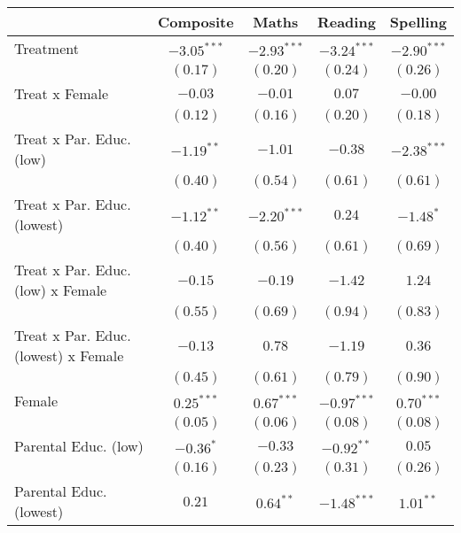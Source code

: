 
\begin{table}
\begin{center}
\begin{tabular}{l c c c c}
\hline
 & Composite & Maths & Reading & Spelling \\
\hline
Treatment                            & $-3.05^{***}$ & $-2.93^{***}$ & $-3.24^{***}$ & $-2.90^{***}$ \\
                                     & $(0.17)$      & $(0.20)$      & $(0.24)$      & $(0.26)$      \\
Treat x Female                       & $-0.03$       & $-0.01$       & $0.07$        & $-0.00$       \\
                                     & $(0.12)$      & $(0.16)$      & $(0.20)$      & $(0.18)$      \\
Treat x Par. Educ. (low)             & $-1.19^{**}$  & $-1.01$       & $-0.38$       & $-2.38^{***}$ \\
                                     & $(0.40)$      & $(0.54)$      & $(0.61)$      & $(0.61)$      \\
Treat x Par. Educ. (lowest)          & $-1.12^{**}$  & $-2.20^{***}$ & $0.24$        & $-1.48^{*}$   \\
                                     & $(0.40)$      & $(0.56)$      & $(0.61)$      & $(0.69)$      \\
Treat x Par. Educ. (low) x Female    & $-0.15$       & $-0.19$       & $-1.42$       & $1.24$        \\
                                     & $(0.55)$      & $(0.69)$      & $(0.94)$      & $(0.83)$      \\
Treat x Par. Educ. (lowest) x Female & $-0.13$       & $0.78$        & $-1.19$       & $0.36$        \\
                                     & $(0.45)$      & $(0.61)$      & $(0.79)$      & $(0.90)$      \\
Female                               & $0.25^{***}$  & $0.67^{***}$  & $-0.97^{***}$ & $0.70^{***}$  \\
                                     & $(0.05)$      & $(0.06)$      & $(0.08)$      & $(0.08)$      \\
Parental Educ. (low)                 & $-0.36^{*}$   & $-0.33$       & $-0.92^{**}$  & $0.05$        \\
                                     & $(0.16)$      & $(0.23)$      & $(0.31)$      & $(0.26)$      \\
Parental Educ. (lowest)              & $0.21$        & $0.64^{**}$   & $-1.48^{***}$ & $1.01^{**}$   \\

\end{tabular}
\end{center}
\end{table}
